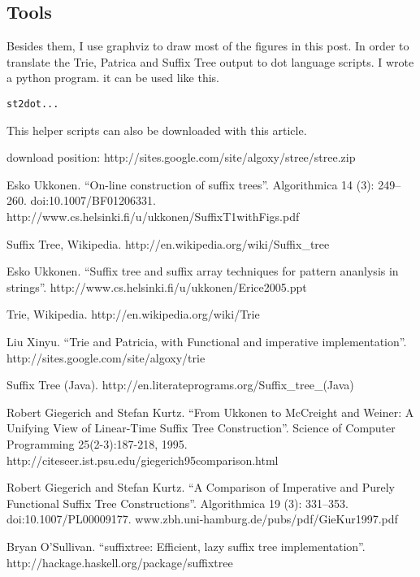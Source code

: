\documentclass{article}
\begin{document}
\subsection{Tools}

Besides them, I use graphviz to draw most of the figures in this post. In order to
translate the Trie, Patrica and Suffix Tree output to dot language scripts. I wrote a python program.
it can be used like this.

\begin{verbatim}
st2dot...
\end{verbatim}

This helper scripts can also be downloaded with this article.

download position: http://sites.google.com/site/algoxy/stree/stree.zip

\begin{thebibliography}{99}

Esko Ukkonen. ``On-line construction of suffix trees''. Algorithmica 14 (3): 249--260. doi:10.1007/BF01206331. http://www.cs.helsinki.fi/u/ukkonen/SuffixT1withFigs.pdf

Suffix Tree, Wikipedia. http://en.wikipedia.org/wiki/Suffix\_tree

Esko Ukkonen. ``Suffix tree and suffix array techniques for pattern ananlysis in strings''. http://www.cs.helsinki.fi/u/ukkonen/Erice2005.ppt

Trie, Wikipedia. http://en.wikipedia.org/wiki/Trie

Liu Xinyu. ``Trie and Patricia, with Functional and imperative implementation''. http://sites.google.com/site/algoxy/trie

Suffix Tree (Java). http://en.literateprograms.org/Suffix\_tree\_(Java)

Robert Giegerich and Stefan Kurtz. ``From Ukkonen to McCreight and Weiner: A Unifying View of Linear-Time Suffix Tree Construction''. Science of Computer Programming 25(2-3):187-218, 1995. http://citeseer.ist.psu.edu/giegerich95comparison.html

Robert Giegerich and Stefan Kurtz. ``A Comparison of Imperative and Purely Functional Suffix Tree Constructions''. Algorithmica 19 (3): 331--353. doi:10.1007/PL00009177. www.zbh.uni-hamburg.de/pubs/pdf/GieKur1997.pdf

Bryan O'Sullivan. ``suffixtree: Efficient, lazy suffix tree implementation''. http://hackage.haskell.org/package/suffixtree


\end{thebibliography}
\end{document}
